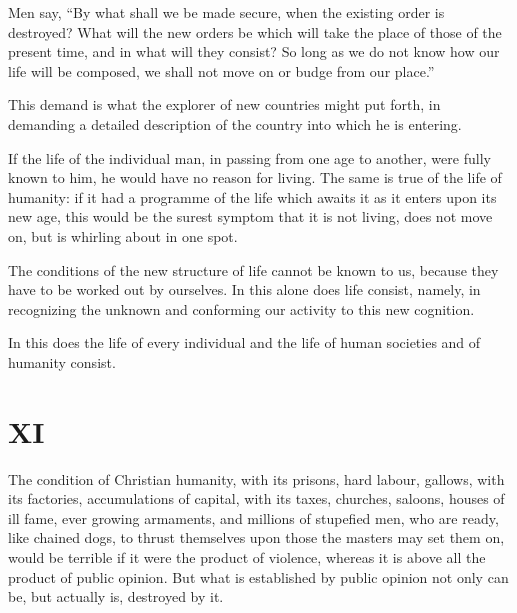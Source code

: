\documentclass{book}
\begin{document}
Men say, “By what shall we be made secure, when the existing order is destroyed? What will the new orders be which will take the place of those of the present time, and in what will they consist? So long as we do not know how our life will be composed, we shall not move on or budge from our place.”

This demand is what the explorer of new countries might put forth, in demanding a detailed description of the country into which he is entering.

If the life of the individual man, in passing from one age to another, were fully known to him, he would have no reason for living. The same is true of the life of humanity: if it had a programme of the life which awaits it as it enters upon its new age, this would be the surest symptom that it is not living, does not move on, but is whirling about in one spot.

The conditions of the new structure of life cannot be known to us, because they have to be worked out by ourselves. In this alone does life consist, namely, in recognizing the unknown and conforming our activity to this new cognition.

In this does the life of every individual and the life of human societies and of humanity consist.

\chapter*{XI}
\label{chapter-11}
The condition of Christian humanity, with its prisons, hard labour, gallows, with its factories, accumulations of capital, with its taxes, churches, saloons, houses of ill fame, ever growing armaments, and millions of stupefied men, who are ready, like chained dogs, to thrust themselves upon those the masters may set them on, would be terrible if it were the product of violence, whereas it is above all the product of public opinion. But what is established by public opinion not only can be, but actually is, destroyed by it.
\end{document}
